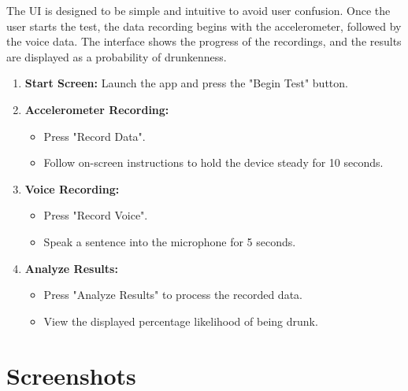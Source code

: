 \documentclass[12pt,a4paper]{article}
\begin{document}
The UI is designed to be simple and intuitive to avoid user confusion. Once the user starts the test, the data recording begins with the accelerometer, followed by the voice data. The interface shows the progress of the recordings, and the results are displayed as a probability of drunkenness.

\begin{enumerate}
    \item \textbf{Start Screen:} Launch the app and press the "Begin Test" button.
    \item \textbf{Accelerometer Recording:}
    \begin{itemize}
        \item Press "Record Data".
        \item Follow on-screen instructions to hold the device steady for 10 seconds.
    \end{itemize}
    \item \textbf{Voice Recording:}
    \begin{itemize}
        \item Press "Record Voice".
        \item Speak a sentence into the microphone for 5 seconds.
    \end{itemize}
    \item \textbf{Analyze Results:}
    \begin{itemize}
        \item Press "Analyze Results" to process the recorded data.
        \item View the displayed percentage likelihood of being drunk.
    \end{itemize}
\end{enumerate}

\newpage

\section{Screenshots}
\end{document}
